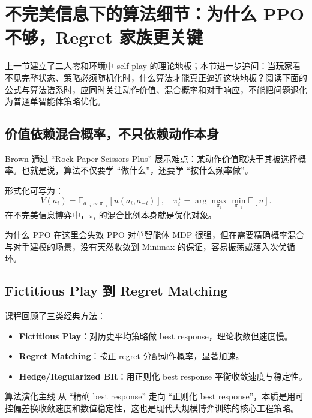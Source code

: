 \documentclass[a4paper]{article}
\begin{document}
\section{不完美信息下的算法细节：为什么 PPO 不够，Regret 家族更关键}

上一节建立了二人零和环境中 self-play 的理论地板；本节进一步追问：当玩家看不见完整状态、策略必须随机化时，什么算法才能真正逼近这块地板？阅读下面的公式与算法谱系时，应同时关注动作价值、混合概率和对手响应，不能把问题退化为普通单智能体策略优化。

\subsection{价值依赖混合概率，不只依赖动作本身}
Brown 通过 ``Rock-Paper-Scissors Plus'' 展示难点：某动作价值取决于其被选择概率。也就是说，算法不仅要学 ``做什么''，还要学 ``按什么频率做''。

形式化可写为：
\[
V(a_i) = \mathbb{E}_{a_{-i}\sim \pi_{-i}}[u(a_i, a_{-i})], \quad
\pi_i^\star = \arg\max_{\pi_i} \min_{\pi_{-i}} \mathbb{E}[u].
\]
在不完美信息博弈中，$\pi_i$ 的混合比例本身就是优化对象。

\begin{knowledgebox}{为什么 PPO 在这里会失效}
PPO 对单智能体 MDP 很强，但在需要精确概率混合与对手建模的场景，没有天然收敛到 Minimax 的保证，容易振荡或落入次优循环。
\end{knowledgebox}

\subsection{Fictitious Play 到 Regret Matching}
课程回顾了三类经典方法：
\begin{itemize}
    \item \textbf{Fictitious Play}：对历史平均策略做 best response，理论收敛但速度慢。
    \item \textbf{Regret Matching}：按正 regret 分配动作概率，显著加速。
    \item \textbf{Hedge/Regularized BR}：用正则化 best response 平衡收敛速度与稳定性。
\end{itemize}

\begin{importantbox}{算法演化主线}
从 ``精确 best response'' 走向 ``正则化 best response''，本质是用可控偏差换收敛速度和数值稳定性，这也是现代大规模博弈训练的核心工程策略。
\end{importantbox}
\end{document}
